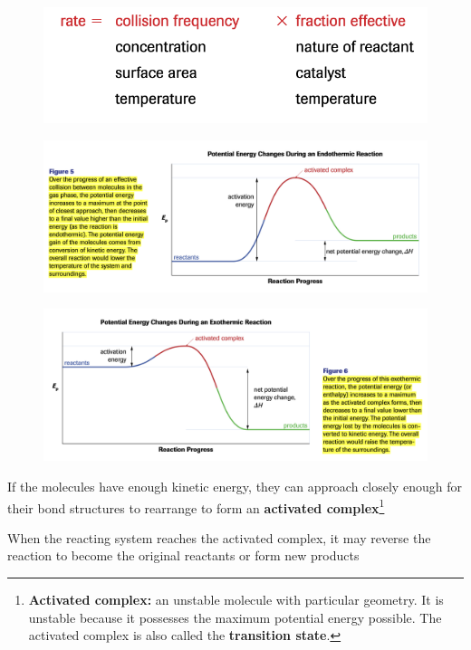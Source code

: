 \begin{figure}[ht!]
    \centering
    \includegraphics[width=0.6 \textwidth]{../figures/factors-affecting-rate-and-collision-theory.png}
\end{figure}

\begin{figure}[ht!]
    \centering
    \includegraphics[width=\textwidth]{../figures/endothermic-reaction-curve.png}
\end{figure}

\begin{figure}[ht!]
    \centering
    \includegraphics[width= \textwidth]{../figures/exothermic-reaction-curve.png}
\end{figure}

\begin{bulleted-list}
    \item If the molecules have enough kinetic energy, they can approach closely enough for their
        bond structures to rearrange to form an \textbf{activated complex}\footnote{
            \textbf{Activated complex:} an unstable molecule with particular geometry. It is unstable
            because it possesses the maximum potential energy possible. The activated complex
            is also called the \textbf{transition state}.
        }
    \item When the reacting system reaches the activated complex, it may reverse the reaction
        to become the original reactants or form new products
\end{bulleted-list}

